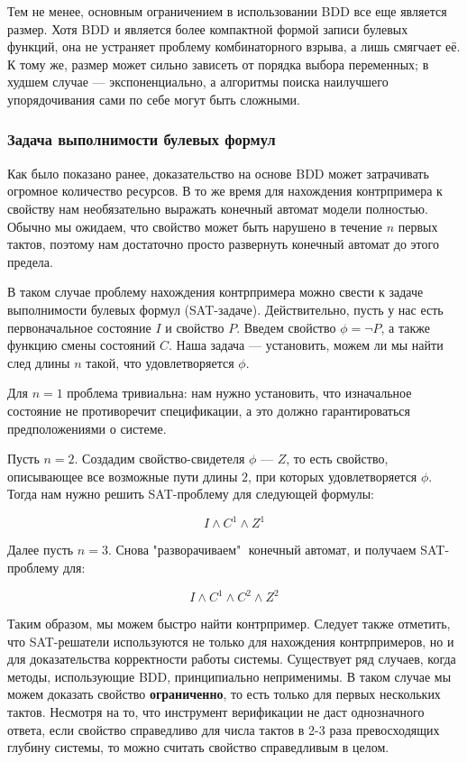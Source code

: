 Тем не менее, основным ограничением в использовании BDD все еще является размер. Хотя BDD и является более компактной формой записи булевых функций, она не устраняет проблему комбинаторного взрыва, а лишь смягчает её. К тому же, размер может сильно зависеть от порядка выбора переменных; в худшем случае --- экспоненциально, а алгоритмы поиска наилучшего упорядочивания сами по себе могут быть сложными. 

\subsubsection{Задача выполнимости булевых формул}

\tab Как было показано ранее, доказательство на основе BDD может затрачивать огромное количество ресурсов. В то же время для нахождения контрпримера к свойству нам необязательно выражать конечный автомат модели полностью. Обычно мы ожидаем, что свойство может быть нарушено в течение $n$ первых тактов, поэтому нам достаточно просто развернуть конечный автомат до этого предела.

В таком случае проблему нахождения контрпримера можно свести к задаче выполнимости булевых формул (SAT-задаче)\cite{formal_roadmap}\cite{sat_formal}. Действительно, пусть у нас есть первоначальное состояние $I$ и свойство $P$. Введем свойство $\phi = \neg P$, а также функцию смены состояний $C$. Наша задача --- установить, можем ли мы найти след длины $n$ такой, что удовлетворяется $\phi$. 

Для $n=1$ проблема тривиальна: нам нужно установить, что изначальное состояние не противоречит спецификации, а это должно гарантироваться предположениями о системе. 

Пусть $n = 2$. Создадим свойство-свидетеля $\phi$ --- $Z$, то есть свойство, описывающее все возможные пути длины $2$, при которых удовлетворяется $\phi$. Тогда нам нужно решить SAT-проблему для следующей формулы:

$$I \land C^1 \land Z^1$$

Далее пусть $n = 3$. Снова "разворачиваем" $\;$конечный автомат, и получаем SAT-проблему для:

$$I \land C^1 \land C^2 \land Z^2$$

Таким образом, мы можем быстро найти контрпример. Следует также отметить, что SAT-решатели используются не только для нахождения контрпримеров, но и для доказательства корректности работы системы. Существует ряд случаев, когда методы, использующие BDD, принципиально неприменимы. В таком случае мы можем доказать свойство \textbf{ограниченно}, то есть только для первых нескольких тактов. Несмотря на то, что инструмент верификации не даст однозначного ответа, если свойство справедливо для числа тактов в 2-3 раза превосходящих глубину системы, то можно считать свойство справедливым в целом\cite{bounded}.

